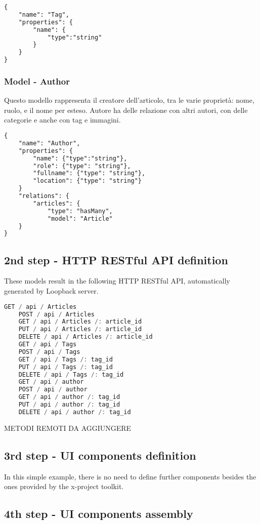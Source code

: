 \begin{lstlisting}[language=html]
{
	"name": "Tag",
	"properties": {
		"name": {
			"type":"string"
		}
	}
}
\end{lstlisting}
\subsubsection{Model - Author}

Questo modello rappresenta il creatore dell'articolo, tra le varie proprietà: nome, ruolo, e il nome per esteso.
Autore ha delle relazione con altri autori, con delle categorie e anche con tag e immagini.

\begin{lstlisting}[language=html]
{
	"name": "Author",
	"properties": {
		"name": {"type":"string"},
    	"role": {"type": "string"},
    	"fullname": {"type": "string"},
    	"location": {"type": "string"}
	}
	"relations": {
    	"articles": {
     		"type": "hasMany",
      		"model": "Article"
    }
}
\end{lstlisting}

\subsection{2nd step - HTTP RESTful API definition}

These models result in the following HTTP RESTful API, automatically generated by Loopback server.

\begin{lstlisting}[language=javascript]
	GET / api / Articles
	POST / api / Articles
	GET / api / Articles /: article_id
	PUT / api / Articles /: article_id
	DELETE / api / Articles /: article_id
	GET / api / Tags
	POST / api / Tags
	GET / api / Tags /: tag_id
	PUT / api / Tags /: tag_id
	DELETE / api / Tags /: tag_id
	GET / api / author
	POST / api / author
	GET / api / author /: tag_id
	PUT / api / author /: tag_id
	DELETE / api / author /: tag_id
\end{lstlisting}

METODI REMOTI DA AGGIUNGERE


\subsection{3rd step - UI components definition}

In this simple example, there is no need to define further components besides the ones provided by the x-project toolkit.

\subsection{4th step - UI components assembly}

